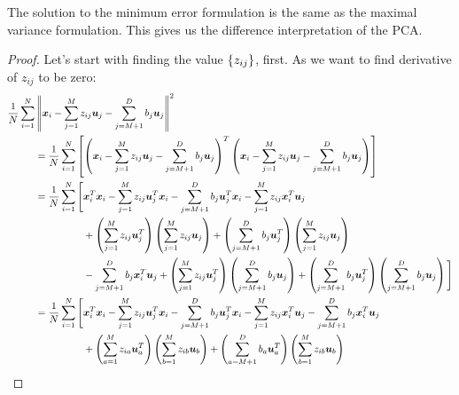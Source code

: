 \begin{proposition}
    The solution to the minimum error formulation is the same as the maximal variance formulation. This gives us the difference interpretation of the PCA.
\end{proposition}
\begin{proof}
    Let's start with finding the value $\left\{ z_{ij} \right\}$, first. As we want to find derivative of $z_{ij}$ to be zero:
    \allowdisplaybreaks
    \begin{align*}
        \frac{1}{N}\sum^N_{i=1}&\norm{\boldsymbol x_i - \sum^M_{j=1}z_{ij}\boldsymbol u_j - \sum^D_{j=M+1}b_j\boldsymbol u_j}^2 \\
        &= \frac{1}{N}\sum^N_{i=1}\brackb{\bracka{\boldsymbol x_i - \sum^M_{j=1}z_{ij}\boldsymbol u_j - \sum^D_{j=M+1}b_j\boldsymbol u_j}^T\bracka{\boldsymbol x_i - \sum^M_{j=1}z_{ij}\boldsymbol u_j - \sum^D_{j=M+1}b_j\boldsymbol u_j}} \\
        &= \begin{aligned}[t] 
            \frac{1}{N}\sum^N_{i=1}\Bigg[
            &\boldsymbol x_i^T\boldsymbol x_i - \sum^M_{j=1}z_{ij}\boldsymbol u_j^T\boldsymbol x_i - \sum^D_{j=M+1}b_j\boldsymbol u_j^T\boldsymbol x_i -\sum^M_{j=1}z_{ij}\boldsymbol x_i^T\boldsymbol u_j \\
            & + \bracka{\sum^M_{j=1}z_{ij}\boldsymbol u_j^T}\bracka{\sum^M_{j=1}z_{ij}\boldsymbol u_j} + \bracka{\sum^D_{j=M+1}b_j\boldsymbol u_j^T}\bracka{\sum^M_{j=1}z_{ij}\boldsymbol u_j} \\
            &-\sum^D_{j=M+1}b_j\boldsymbol x_i^T\boldsymbol u_j + \bracka{\sum^M_{j=1}z_{ij}\boldsymbol u_j^T}\bracka{\sum^D_{j=M+1}b_j\boldsymbol u_j} + \bracka{\sum^D_{j=M+1}b_j\boldsymbol u_j^T}\bracka{\sum^D_{j=M+1}b_j\boldsymbol u_j}\Bigg]  \\
        \end{aligned} \\
        &= \begin{aligned}[t] 
            \frac{1}{N}\sum^N_{i=1}\Bigg[
            &\boldsymbol x_i^T\boldsymbol x_i - \sum^M_{j=1}z_{ij}\boldsymbol u_j^T\boldsymbol x_i - \sum^D_{j=M+1}b_j\boldsymbol u_j^T\boldsymbol x_i -\sum^M_{j=1}z_{ij}\boldsymbol x_i^T\boldsymbol u_j-\sum^D_{j=M+1}b_j\boldsymbol x_i^T\boldsymbol u_j  \\
            & + \bracka{\sum^M_{a=1}z_{ia}\boldsymbol u_a^T}\bracka{\sum^M_{b=1}z_{ib}\boldsymbol u_b} + \bracka{\sum^D_{a=M+1}b_a\boldsymbol u_a^T}\bracka{\sum^M_{b=1}z_{ib}\boldsymbol u_b} \\

\end{aligned}
\end{align*}
\end{proof}
